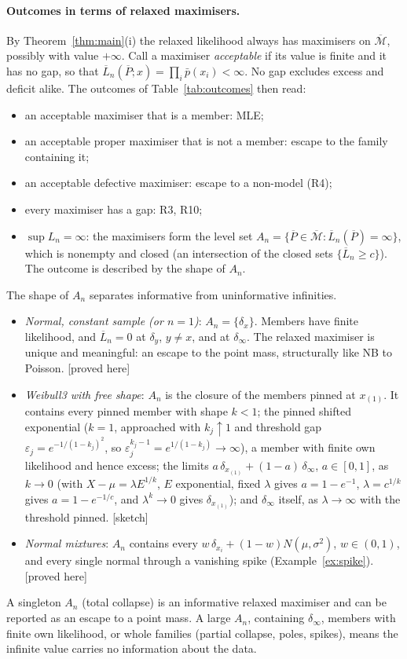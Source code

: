 \documentclass[11pt]{article}
\newcommand{\bM}{\overline{\mathcal M}}
\newcommand{\bP}{\overline P}
\newcommand{\bL}{\overline L}
\newcommand{\status}[1]{\textsf{[#1]}}
\theoremstyle{definition}
\theoremstyle{remark}
\begin{document}
\paragraph{Outcomes in terms of relaxed maximisers.} By
Theorem~\ref{thm:main}(i) the relaxed likelihood always has maximisers on
$\bM$, possibly with value $+\infty$. Call a maximiser \emph{acceptable} if
its value is finite and it has no gap, so that
$\bL_n(\bP;x)=\prod_i\bar p(x_i)<\infty$. No gap excludes excess and
deficit alike. The outcomes of Table~\ref{tab:outcomes} then read:
\begin{itemize}
\item an acceptable maximiser that is a member: MLE;
\item an acceptable proper maximiser that is not a member: escape to the
  family containing it;
\item an acceptable defective maximiser: escape to a non-model (R4);
\item every maximiser has a gap: R3, R10;
\item $\sup L_n=\infty$: the maximisers form the level set
  $A_n=\{\bP\in\bM:\bL_n(\bP)=\infty\}$, which is nonempty and closed (an
  intersection of the closed sets $\{\bL_n\ge c\}$). The outcome is
  described by the shape of $A_n$.
\end{itemize}
The shape of $A_n$ separates informative from uninformative infinities.
\begin{itemize}
\item \emph{Normal, constant sample (or $n=1$)}: $A_n=\{\delta_x\}$. Members
  have finite likelihood, and $\bL_n=0$ at $\delta_y$, $y\ne x$, and at
  $\delta_\infty$. The relaxed maximiser is unique and meaningful: an escape
  to the point mass, structurally like NB to Poisson. \status{proved here}
\item \emph{Weibull3 with free shape}: $A_n$ is the closure of the members
  pinned at $x_{(1)}$. It contains every pinned member with shape $k<1$;
  the pinned shifted exponential ($k=1$, approached with $k_j\uparrow1$ and
  threshold gap $\varepsilon_j=e^{-1/(1-k_j)^2}$, so
  $\varepsilon_j^{k_j-1}=e^{1/(1-k_j)}\to\infty$), a member with finite own
  likelihood and hence excess; the limits
  $a\,\delta_{x_{(1)}}+(1-a)\,\delta_\infty$, $a\in[0,1]$, as $k\to0$ (with
  $X-\mu=\lambda E^{1/k}$, $E$ exponential, fixed $\lambda$ gives
  $a=1-e^{-1}$, $\lambda=c^{1/k}$ gives $a=1-e^{-1/c}$, and $\lambda^k\to0$
  gives $\delta_{x_{(1)}}$); and $\delta_\infty$ itself, as $\lambda\to\infty$
  with the threshold pinned. \status{sketch}
\item \emph{Normal mixtures}: $A_n$ contains every
  $w\,\delta_{x_i}+(1-w)N(\mu,\sigma^2)$, $w\in(0,1)$, and every single
  normal through a vanishing spike (Example~\ref{ex:spike}).
  \status{proved here}
\end{itemize}
A singleton $A_n$ (total collapse) is an informative relaxed maximiser and
can be reported as an escape to a point mass. A large $A_n$, containing
$\delta_\infty$, members with finite own likelihood, or whole families
(partial collapse, poles, spikes), means the infinite value carries no
information about the data.
\end{document}
